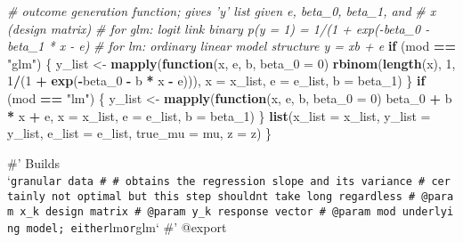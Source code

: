 \documentclass[
]{article}
\newenvironment{Shaded}{\begin{snugshade}}{\end{snugshade}}
\newcommand{\CommentTok}[1]{\textcolor[rgb]{0.56,0.35,0.01}{\textit{#1}}}
\newcommand{\ControlFlowTok}[1]{\textcolor[rgb]{0.13,0.29,0.53}{\textbf{#1}}}
\newcommand{\DataTypeTok}[1]{\textcolor[rgb]{0.13,0.29,0.53}{#1}}
\newcommand{\DecValTok}[1]{\textcolor[rgb]{0.00,0.00,0.81}{#1}}
\newcommand{\KeywordTok}[1]{\textcolor[rgb]{0.13,0.29,0.53}{\textbf{#1}}}
\newcommand{\NormalTok}[1]{#1}
\newcommand{\OperatorTok}[1]{\textcolor[rgb]{0.81,0.36,0.00}{\textbf{#1}}}
\newcommand{\StringTok}[1]{\textcolor[rgb]{0.31,0.60,0.02}{#1}}
\begin{document}
\begin{Shaded}
\begin{Highlighting}[]
  \CommentTok{# outcome generation function; gives 'y' list given e, beta_0, beta_1, and}
  \CommentTok{# x (design matrix)}
  \CommentTok{# for glm: logit link binary p(y = 1) = 1/(1 + exp(-beta_0 - beta_1 * x - e)}
  \CommentTok{# for lm: ordinary linear model structure y = xb + e}
  \ControlFlowTok{if}\NormalTok{ (mod }\OperatorTok{==}\StringTok{ "glm"}\NormalTok{) \{}
\NormalTok{    y_list <-}\StringTok{ }\KeywordTok{mapply}\NormalTok{(}\ControlFlowTok{function}\NormalTok{(x, e, b, }\DataTypeTok{beta_0 =} \DecValTok{0}\NormalTok{)}
      \KeywordTok{rbinom}\NormalTok{(}\KeywordTok{length}\NormalTok{(x), }\DecValTok{1}\NormalTok{, }\DecValTok{1}\OperatorTok{/}\NormalTok{(}\DecValTok{1} \OperatorTok{+}\StringTok{ }\KeywordTok{exp}\NormalTok{(}\OperatorTok{-}\NormalTok{beta_}\DecValTok{0} \OperatorTok{-}\StringTok{ }\NormalTok{b }\OperatorTok{*}\StringTok{ }\NormalTok{x }\OperatorTok{-}\StringTok{ }\NormalTok{e))),}
      \DataTypeTok{x =}\NormalTok{ x_list, }\DataTypeTok{e =}\NormalTok{ e_list, }\DataTypeTok{b =}\NormalTok{ beta_}\DecValTok{1}\NormalTok{)}
\NormalTok{  \}}
  \ControlFlowTok{if}\NormalTok{ (mod }\OperatorTok{==}\StringTok{ "lm"}\NormalTok{) \{}
\NormalTok{    y_list <-}\StringTok{ }\KeywordTok{mapply}\NormalTok{(}\ControlFlowTok{function}\NormalTok{(x, e, b, }\DataTypeTok{beta_0 =} \DecValTok{0}\NormalTok{)}
\NormalTok{      beta_}\DecValTok{0} \OperatorTok{+}\StringTok{ }\NormalTok{b }\OperatorTok{*}\StringTok{ }\NormalTok{x }\OperatorTok{+}\StringTok{ }\NormalTok{e, }\DataTypeTok{x =}\NormalTok{ x_list, }\DataTypeTok{e =}\NormalTok{ e_list, }\DataTypeTok{b =}\NormalTok{ beta_}\DecValTok{1}\NormalTok{)}
\NormalTok{  \}}
  \KeywordTok{list}\NormalTok{(}\DataTypeTok{x_list =}\NormalTok{ x_list, }\DataTypeTok{y_list =}\NormalTok{ y_list, }\DataTypeTok{e_list =}\NormalTok{ e_list, }\DataTypeTok{true_mu =}\NormalTok{ mu, }\DataTypeTok{z =}\NormalTok{ z)}
\NormalTok{\}}
\end{Highlighting}
\end{Shaded}

\#' Builds
`\texttt{granular\textquotesingle{}\textquotesingle{}\ data\ \#\textquotesingle{}\ \#\textquotesingle{}\ obtains\ the\ regression\ slope\ and\ its\ variance\ \#\textquotesingle{}\ certainly\ not\ optimal\ but\ this\ step\ shouldn\textquotesingle{}t\ take\ long\ regardless\ \#\textquotesingle{}\ @param\ x\_k\ design\ matrix\ \#\textquotesingle{}\ @param\ y\_k\ response\ vector\ \#\textquotesingle{}\ @param\ mod\ underlying\ model;\ either}lm\texttt{or}glm`
\#' @export
\end{document}
